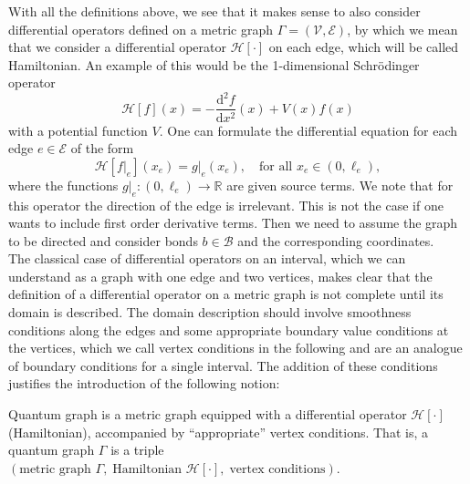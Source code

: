 With all the definitions above, we see that it makes sense to also consider differential operators defined on a metric graph $\Gamma = (\mathcal{V}, \mathcal{E})$, by which we mean that we consider a differential operator $\mathcal{H} \left[ \cdot \right]$ on each edge, which will be called Hamiltonian. An example of this would be the 1-dimensional Schrödinger operator
\begin{equation*}
    \mathcal{H} \left[ f \right](x) = -\frac{\mathrm{d}^2 f}{\mathrm{d} x^2}(x) + V(x)f(x)
\end{equation*}
with a potential function $V$. One can formulate the differential equation for each edge $e \in \mathcal{E}$ of the form
\begin{equation*}
    \mathcal{H} \left[ f |_e \right] (x_e) = g|_e(x_e), \quad \text{for all  } x_e \in (0, \ell_e),
\end{equation*}
where the functions $g|_e \colon (0, \ell_e) \to \mathbb{R}$ are given source terms. We note that for this operator the direction of the edge is irrelevant. This is not the case if one wants to include first order derivative terms. Then we need to assume the graph to be directed and consider bonds $b \in \mathcal{B}$ and the corresponding coordinates. \\
The classical case of differential operators on an interval, which we can understand as a graph with one edge and two vertices, makes clear that the definition of a differential operator on a metric graph is not complete until its domain is described. The domain description should involve smoothness conditions along the edges and some appropriate boundary value conditions at the vertices, which we call vertex conditions in the following and are an analogue of boundary conditions for a single interval. The addition of these conditions justifies the introduction of the following notion:

\begin{definition}
    \label{quantum graph}
    Quantum graph is a metric graph equipped with a differential operator $\mathcal{H} \left[ \cdot \right]$ (Hamiltonian), accompanied by “appropriate” vertex conditions. That is, a quantum graph $\Gamma$ is a triple \\
    $(\text{metric graph } \Gamma, \; \text{Hamiltonian } \mathcal{H} \left[ \cdot \right], \; \text{vertex conditions})$.
\end{definition}

